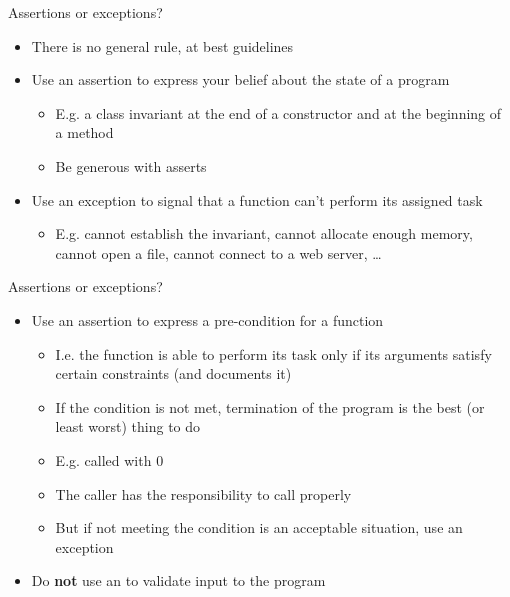 \begin{frame}{Assertions or exceptions?}

  \begin{itemize}
  \item There is no general rule, at best guidelines
  \item<2-> Use an assertion to express your belief about the state of a program
    \begin{itemize}
    \item E.g. a class invariant at the end of a constructor and at the
      beginning of a method
    \item Be generous with asserts
    \end{itemize}
  \item<3-> Use an exception to signal that a function can't perform its assigned
    task
    \begin{itemize}
    \item E.g. cannot establish the invariant, cannot allocate enough memory,
      cannot open a file, cannot connect to a web server, \ldots
    \end{itemize}
  \end{itemize}
\end{frame}

\begin{frame}{Assertions or exceptions? \insertcontinuationtext}

  \begin{itemize}
  \item Use an assertion to express a pre-condition for a function
    \begin{itemize}
    \item I.e. the function is able to perform its task only if its arguments
      satisfy certain constraints (and documents it)
    \item If the condition is not met, termination of the program is the best (or
      least worst) thing to do
    \item E.g.  called with $0$
    \item The caller has the responsibility to call properly
    \item But if not meeting the condition is an acceptable situation, use an
      exception
    \end{itemize}
  \item Do \textbf{not} use an  to validate input to the program
  \end{itemize}

\end{frame}

